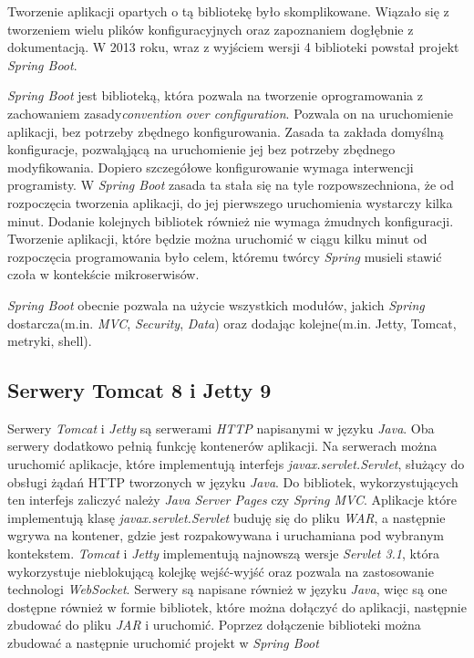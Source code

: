 Tworzenie aplikacji opartych o tą bibliotekę było skomplikowane. Wiązało się z tworzeniem wielu plików konfiguracyjnych oraz zapoznaniem dogłębnie z dokumentacją. W 2013 roku, wraz z wyjściem wersji 4 biblioteki powstał projekt \textsl{Spring Boot}. 

\textsl{Spring Boot} jest biblioteką, która pozwala na tworzenie oprogramowania z zachowaniem zasady\textsl{convention over configuration}. Pozwala on na uruchomienie aplikacji, bez potrzeby zbędnego konfigurowania. Zasada ta zakłada domyślną konfiguracje, pozwaląjącą na uruchomienie jej bez potrzeby zbędnego modyfikowania. Dopiero szczegółowe konfigurowanie wymaga interwencji programisty. W \textsl{Spring Boot} zasada ta stała się na tyle rozpowszechniona, że od rozpoczęcia tworzenia aplikacji, do jej pierwszego uruchomienia wystarczy kilka minut. Dodanie kolejnych bibliotek również nie wymaga żmudnych konfiguracji. Tworzenie aplikacji, które będzie można uruchomić w ciągu kilku minut od rozpoczęcia programowania było celem, któremu twórcy \textsl{Spring} musieli stawić czoła w kontekście mikroserwisów. 

\textsl{Spring Boot} obecnie pozwala na użycie wszystkich modułów, jakich \textsl{Spring} dostarcza(m.in. \textsl{MVC}, \textsl{Security}, \textsl{Data}) oraz dodając kolejne(m.in. Jetty, Tomcat, metryki, shell). 

\subsection{Serwery Tomcat 8 i Jetty 9} 
Serwery \textsl{Tomcat} i \textsl{Jetty} są serwerami \textsl{HTTP} napisanymi w języku \textsl{Java}. Oba serwery dodatkowo pełnią funkcję kontenerów aplikacji. Na serwerach można uruchomić aplikacje, które implementują interfejs \textsl{javax.servlet.Servlet}, służący do obsługi żądań HTTP tworzonych w języku \textsl{Java}. Do bibliotek, wykorzystujących ten interfejs zaliczyć należy \textsl{Java Server Pages} czy \textsl{Spring MVC}. Aplikacje które implementują klasę \textsl{javax.servlet.Servlet} buduję się do pliku \textsl{WAR}, a następnie wgrywa na kontener, gdzie jest rozpakowywana i uruchamiana pod wybranym kontekstem. \textsl{Tomcat} i \textsl{Jetty} implementują najnowszą wersje \textsl{Servlet 3.1}, która wykorzystuje nieblokującą kolejkę wejść-wyjść oraz pozwala na zastosowanie technologi \textsl{WebSocket}. Serwery są napisane również w języku \textsl{Java}, więc są one dostępne również w formie bibliotek, które można dołączyć do aplikacji, następnie zbudować do pliku \textsl{JAR} i uruchomić. Poprzez dołączenie biblioteki można zbudować a następnie uruchomić projekt w \textsl{Spring Boot}


